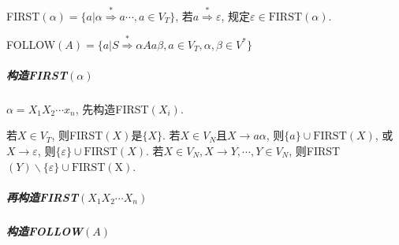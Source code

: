                FIRST$(\alpha)=\{a|\alpha\stackrel{*}{\Rightarrow}a\cdots, a\in V_T\}$, 若$a\stackrel{*}{\Rightarrow}\varepsilon$, 规定$\varepsilon\in\mathrm{FIRST}(\alpha)$.

                FOLLOW$(A)=\{a|S\stackrel{*}{\Rightarrow}\alpha Aa\beta, a\in V_T, \alpha, \beta\in V^*\}$

                \subparagraph{构造FIRST$(\alpha)$}

                    $\alpha=X_1X_2\cdots x_n$, 先构造FIRST$(X_i)$.


                    若$X\in V_T$, 则FIRST$(X)$是$\{X\}$. 若$X\in V_N$且$X\to a\alpha$, 则$\{a\}\cup \mathrm{FIRST}(X)$, 或$X\to \varepsilon$, 则$\{\varepsilon\}\cup \mathrm{FIRST}(X)$. 若$X\in V_N, X\to Y,\cdots, Y\in V_N$, 则FIRST$(Y)\backslash\{\varepsilon\}\cup \mathrm{FIRST(X)}$.

                \subparagraph{再构造FIRST$(X_1X_2\cdots X_n)$}

                \subparagraph{构造FOLLOW$(A)$}
